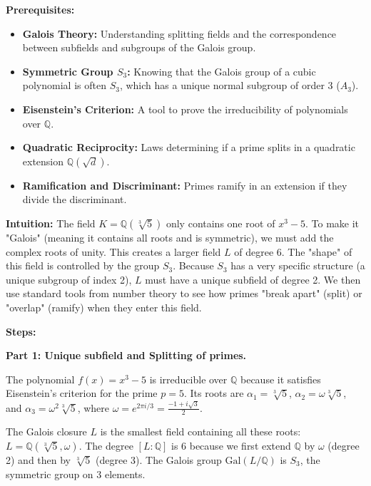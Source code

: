 \begin{solution}
\textbf{Prerequisites:}
\begin{itemize}
    \item \textbf{Galois Theory:} Understanding splitting fields and the correspondence between subfields and subgroups of the Galois group.
    \item \textbf{Symmetric Group $S_3$:} Knowing that the Galois group of a cubic polynomial is often $S_3$, which has a unique normal subgroup of order 3 ($A_3$).
    \item \textbf{Eisenstein's Criterion:} A tool to prove the irreducibility of polynomials over $\mathbb{Q}$.
    \item \textbf{Quadratic Reciprocity:} Laws determining if a prime splits in a quadratic extension $\mathbb{Q}(\sqrt{d})$.
    \item \textbf{Ramification and Discriminant:} Primes ramify in an extension if they divide the discriminant.
\end{itemize}

\bigskip

\textbf{Intuition:}
The field $K = \mathbb{Q}(\sqrt[3]{5})$ only contains one root of $x^3-5$. To make it "Galois" (meaning it contains all roots and is symmetric), we must add the complex roots of unity. This creates a larger field $L$ of degree 6. The "shape" of this field is controlled by the group $S_3$. Because $S_3$ has a very specific structure (a unique subgroup of index 2), $L$ must have a unique subfield of degree 2. We then use standard tools from number theory to see how primes "break apart" (split) or "overlap" (ramify) when they enter this field.

\bigskip

\textbf{Steps:}

\textbf{Part 1: Unique subfield and Splitting of primes.}

The polynomial $f(x) = x^3 - 5$ is irreducible over $\mathbb{Q}$ because it satisfies Eisenstein's criterion for the prime $p=5$. Its roots are $\alpha_1 = \sqrt[3]{5}$, $\alpha_2 = \omega\sqrt[3]{5}$, and $\alpha_3 = \omega^2\sqrt[3]{5}$, where $\omega = e^{2\pi i/3} = \frac{-1 + i\sqrt{3}}{2}$.

\bigskip

The Galois closure $L$ is the smallest field containing all these roots: $L = \mathbb{Q}(\sqrt[3]{5}, \omega)$. The degree $[L:\mathbb{Q}]$ is 6 because we first extend $\mathbb{Q}$ by $\omega$ (degree 2) and then by $\sqrt[3]{5}$ (degree 3). The Galois group $\mathrm{Gal}(L/\mathbb{Q})$ is $S_3$, the symmetric group on 3 elements.


\end{solution}
